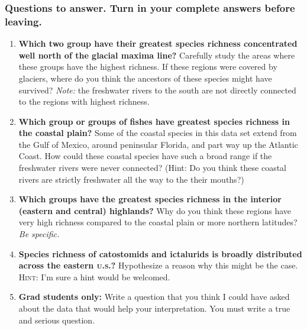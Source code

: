 \documentclass[11pt]{article}
\begin{document}
\subsubsection*{Questions to answer. Turn in your complete answers before leaving.}

\smallskip

\begin{enumerate}[resume]
	\item \textbf{Which two group have their greatest species richness concentrated well north of the glacial maxima line?} Carefully study the areas where these groups have the highest richness. If these regions were covered by glaciers, where do you think the ancestors of these species might have survived? \textit{Note:} the freshwater rivers to the south are not directly connected to the regions with highest richness.

	\vspace{6\baselineskip}

	\item \textbf{Which group or groups of fishes have greatest species richness in the coastal plain?} Some of the coastal species in this data set extend from the Gulf of Mexico, around peninsular Florida, and part way up the Atlantic Coast. How could these coastal species have such a broad range if the freshwater rivers were never connected? (Hint: Do you think these coastal rivers are strictly freshwater all the way to the their mouths?)
	
	\vspace{6\baselineskip}
	
	\item \textbf{Which groups have the greatest species richness in the interior (eastern and central) highlands?}  Why do you think these regions have very high richness compared to the coastal plain or more northern latitudes? \textit{Be specific.}
	
	\vspace{6\baselineskip}

	\item \textbf{Species richness of catostomids and ictalurids is broadly distributed across the eastern \textsc{u.s.?}} Hypothesize a reason why this might be the case. \textsc{Hint:} I'm sure a hint would be welcomed.

	\vspace{6\baselineskip}
	
	\item \textbf{Grad students only:} Write a question that you think I could have asked about the data that would help your interpretation. You must write a true and serious question.
	

\end{enumerate}
\end{document}
